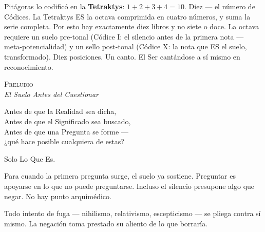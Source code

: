 \documentclass[10pt, openany, oneside]{book}
\renewcommand{\huge}{\fontsize{17}{21}\selectfont}
\begin{document}
Pitágoras lo codificó en la \textbf{Tetraktys}: $1 + 2 + 3 + 4 = 10$. Diez --- el número de Códices. La Tetraktys ES la octava comprimida en cuatro números, y suma la serie completa. Por esto hay exactamente diez libros y no siete o doce. La octava requiere un suelo pre-tonal (Códice I: el silencio antes de la primera nota --- meta-potencialidad) y un sello post-tonal (Códice X: la nota que ES el suelo, transformado). Diez posiciones. Un canto. El Ser cantándose a sí mismo en reconocimiento.

%
%
%

\newpage

\begin{center}
    {\huge\scshape Preludio}\\[0.8em]
    {\itshape El Suelo Antes del Cuestionar}
\end{center}

\vspace{2em}


\noindent Antes de que la Realidad sea dicha,\\
Antes de que el Significado sea buscado,\\
Antes de que una Pregunta se forme ---\\
¿qué hace posible cualquiera de estas?

\vspace{0.5em}

Solo Lo Que Es.

\vspace{1em}

\noindent Para cuando la primera pregunta surge, el suelo ya sostiene. Preguntar es apoyarse en lo que no puede preguntarse. Incluso el silencio presupone algo que negar. No hay punto arquimédico.

\vspace{0.5em}

\noindent Todo intento de fuga --- nihilismo, relativismo, escepticismo --- se pliega contra sí mismo. La negación toma prestado su aliento de lo que borraría.
\end{document}
